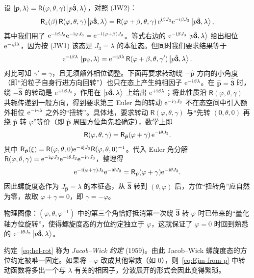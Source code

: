 \begin{proof*}
设 $\ket{\bm p,\lambda}=\mathsf R(\varphi,\theta,\gamma)\ket{p\hat{\bm 3},\lambda}$，对照 (JW2)：
$$
\mathsf R_z(\beta)\,\mathsf R(\varphi,\theta,\gamma)\ket{p\hat{\bm 3},\lambda}
=\mathsf R(\varphi+\beta,\theta,\gamma)\,\mathrm{e}^{\mathrm{i}\beta J_3}\mathrm{e}^{-\mathrm{i}\beta J_3}\ket{p\hat{\bm 3},\lambda},
$$
其中我们用了 $\mathrm{e}^{-\mathrm{i}\beta J_3}\mathrm{e}^{-\mathrm{i}\varphi J_3}=\mathrm{e}^{-\mathrm{i}(\varphi+\beta)J_3}$。等式右边的 $\mathrm{e}^{-\mathrm{i}\beta J_3}\ket{p\hat{\bm 3},\lambda}$ 给出相位 $\mathrm{e}^{-\mathrm{i}\beta\lambda}$，因为按 (JW1) 该态是 $J_3=\lambda$ 的本征态。但同时我们要求结果等于
$$
\mathrm{e}^{-\mathrm{i}\beta\lambda}\,\ket{\bm p_\beta,\lambda}=\mathrm{e}^{-\mathrm{i}\beta\lambda}\,\mathsf R(\varphi+\beta,\theta,\gamma')\ket{p\hat{\bm 3},\lambda}.
$$
对比可知 $\gamma'=\gamma$，且无须额外相位调整。下面再要求转动绕 $-\hat{\bm p}$ 方向的小角度（即“沿粒子自身行进方向回转”）也只在态上产生纯相因子 $\mathrm{e}^{-\mathrm{i}\beta\lambda}$。在 $\hat{\bm p}=\hat{\bm 3}$ 时，绕 $-\hat{\bm 3}$ 的转动是 $\mathrm{e}^{+\mathrm{i}\beta J_3}$，作用在 $\ket{p\hat{\bm 3},\lambda}$ 上给出 $\mathrm{e}^{+\mathrm{i}\beta\lambda}$；将此性质沿 $\mathsf R(\varphi,\theta,\gamma)$ 共轭传递到一般方向，得到要求第三 Euler 角的转动 $\mathrm{e}^{-\mathrm{i}\gamma J_3}$ 不在态空间中引入额外相位 $\mathrm{e}^{-\mathrm{i}\gamma\lambda}$ 之外的“扭转”。具体地，要求转动 $\mathsf R(\varphi,\theta,\gamma)$ 与“先转 $(0,\theta,0)$ 再绕 $\hat{\bm p}$ 转 $\varphi$”等价（即 $\hat{\bm p}$ 周围方位角先验确定），数学上即
$$
\mathsf R(\varphi,\theta,\gamma)=\mathsf R_{\hat{\bm p}}(\varphi+\gamma)\,\mathrm{e}^{-\mathrm{i}\theta J_2}.
$$
其中 $\mathsf R_{\hat{\bm p}}(\xi)=\mathsf R(\varphi,\theta,0)\mathrm{e}^{-\mathrm{i}\xi J_3}\mathsf R(\varphi,\theta,0)^{-1}$。代入 Euler 角分解 $\mathsf R(\varphi,\theta,\gamma)=\mathrm{e}^{-\mathrm{i}\varphi J_3}\mathrm{e}^{-\mathrm{i}\theta J_2}\mathrm{e}^{-\mathrm{i}\gamma J_3}$，整理得
$$
\mathrm{e}^{-\mathrm{i}(\varphi+\gamma)J_3}\mathrm{e}^{-\mathrm{i}\theta J_2}=\mathsf R_{\hat{\bm p}}(\varphi+\gamma)\mathrm{e}^{-\mathrm{i}\theta J_2}.
$$
因此螺旋度态作为 $J_{\hat{\bm p}}=\lambda$ 的本征态，从 $\hat{\bm 3}$ 转到 $(\theta,\varphi)$ 后，方位“扭转角”应自然为零，故取 $\varphi+\gamma=0$，即 $\gamma=-\varphi$。

物理图像：$(\varphi,\theta,\varphi^{-1})$ 中的第三个角恰好抵消第一次绕 $\hat{\bm 3}$ 转 $\varphi$ 时已带来的“量化轴方位旋转”，使得螺旋度态的方位约定独立于 $\varphi$，这就保证了 $\varphi=0$ 时回到熟悉的 $\mathrm{e}^{-\mathrm{i}\theta J_2}\ket{p\hat{\bm 3},\lambda}$。
\end{proof*}

\begin{remark}
约定~\eqref{eq:hel-rot} 称为 \emph{Jacob--Wick 约定} (1959)。由此 Jacob--Wick 螺旋度态的方位约定被唯一固定。如果将 $-\varphi$ 改成其他常数（如 $0$），则~\eqref{eq:Ejm-from-p} 中转动函数将多出一个与 $\lambda$ 有关的相因子，分波展开的形式会因此变得繁琐。
\end{remark}

